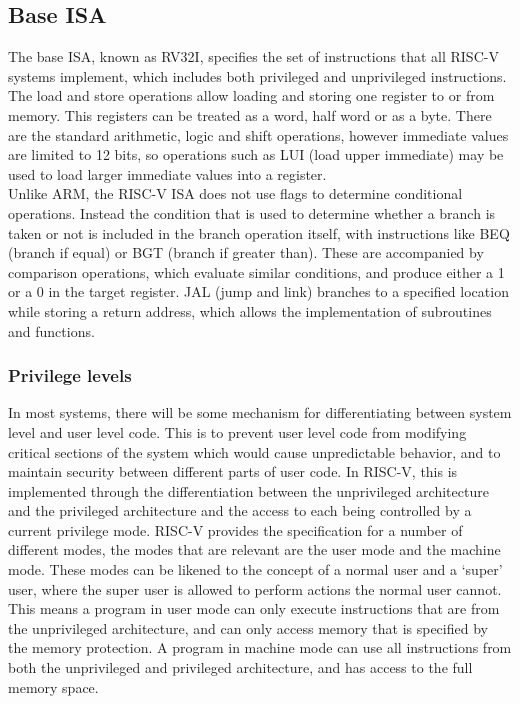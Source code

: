 \subsection{Base ISA}
The base ISA, known as RV32I, specifies the set of instructions that all RISC-V systems implement, which includes both privileged and unprivileged instructions. The load and store operations allow loading and storing one register to or from memory. This registers can be treated as a word, half word or as a byte. There are the standard arithmetic, logic and shift operations, however immediate values are limited to 12 bits, so operations such as LUI (load upper immediate) may be used to load larger immediate values into a register.\\
Unlike ARM, the RISC-V ISA does not use flags to determine conditional operations. Instead the condition that is used to determine whether a branch is taken or not is included in the branch operation itself, with instructions like BEQ (branch if equal) or BGT (branch if greater than). These are accompanied by comparison operations, which evaluate similar conditions, and produce either a 1 or a 0 in the target register. JAL (jump and link) branches to a specified location while storing a return address, which allows the implementation of subroutines and functions\cite{riscv_unpriv}.
\subsubsection{Privilege levels}
In most systems, there will be some mechanism for differentiating between system level and user level code. This is to prevent user level code from modifying critical sections of the system which would cause unpredictable behavior, and to maintain security between different parts of user code. In RISC-V, this is implemented through the differentiation between the unprivileged architecture and the privileged architecture and the access to each being controlled by a current privilege mode. RISC-V provides the specification for a number of different modes, the modes that are relevant are the user mode and the machine mode. These modes can be likened to the concept of a normal user and a `super' user, where the super user is allowed to perform actions the normal user cannot. This means a program in user mode can only execute instructions that are from the unprivileged architecture, and can only access memory that is specified by the memory protection. A program in machine mode can use all instructions from both the unprivileged and privileged architecture, and has access to the full memory space.
